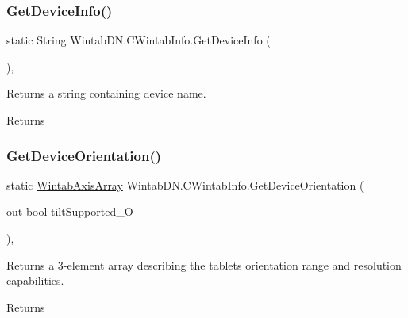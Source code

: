 \subsubsection{\texorpdfstring{Get\+Device\+Info()}{GetDeviceInfo()}}
{\footnotesize\ttfamily static String Wintab\+D\+N.\+C\+Wintab\+Info.\+Get\+Device\+Info (\begin{DoxyParamCaption}{ }\end{DoxyParamCaption})\hspace{0.3cm}{\ttfamily [inline]}, {\ttfamily [static]}}



Returns a string containing device name. 

\begin{DoxyReturn}{Returns}

\end{DoxyReturn}
\mbox{\label{class_wintab_d_n_1_1_c_wintab_info_aa434ebb04517c6e7c8f85ece02b0b7dc}} 
\subsubsection{\texorpdfstring{Get\+Device\+Orientation()}{GetDeviceOrientation()}}
{\footnotesize\ttfamily static \mbox{\hyperlink{struct_wintab_d_n_1_1_wintab_axis_array}{Wintab\+Axis\+Array}} Wintab\+D\+N.\+C\+Wintab\+Info.\+Get\+Device\+Orientation (\begin{DoxyParamCaption}\item[{out bool}]{tilt\+Supported\+\_\+O }\end{DoxyParamCaption})\hspace{0.3cm}{\ttfamily [inline]}, {\ttfamily [static]}}



Returns a 3-\/element array describing the tablet\textquotesingle{}s orientation range and resolution capabilities. 

\begin{DoxyReturn}{Returns}

\end{DoxyReturn}
\mbox{\label{class_wintab_d_n_1_1_c_wintab_info_a8a7c68dbd64e532a45f7ad0d954e8771}} 
